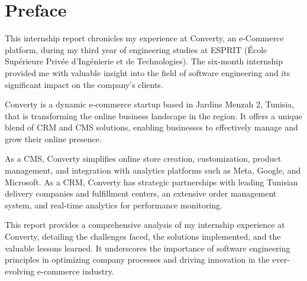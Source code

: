 \chapter*{Preface}

This internship report chronicles my experience at Converty, an e-Commerce platform, during my third year of engineering studies at ESPRIT (École Supérieure Privée d'Ingénierie et de Technologies). The six-month internship provided me with valuable insight into the field of software engineering and its significant impact on the company's clients.
\newline

Converty is a dynamic e-commerce startup based in Jardins Menzah 2, Tunisia, that is transforming the online business landscape in the region. It offers a unique blend of CRM and CMS solutions, enabling businesses to effectively manage and grow their online presence.
\newline

As a CMS, Converty simplifies online store creation, customization, product management, and integration with analytics platforms such as Meta, Google, and Microsoft. As a CRM, Converty has strategic partnerships with leading Tunisian delivery companies and fulfillment centers, an extensive order management system, and real-time analytics for performance monitoring.
\newline

This report provides a comprehensive analysis of my internship experience at Converty, detailing the challenges faced, the solutions implemented, and the valuable lessons learned. It underscores the importance of software engineering principles in optimizing company processes and driving innovation in the ever-evolving e-commerce industry.
